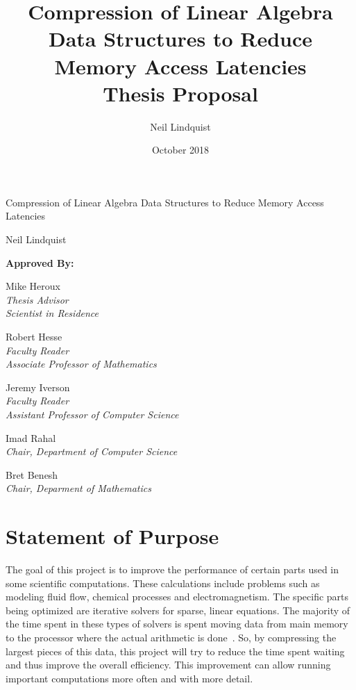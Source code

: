 \documentclass[titlepage]{article}
\begin{document}
\title{
	Compression of Linear Algebra Data Structures to Reduce Memory Access Latencies \\
	\bigskip
	\Large Thesis Proposal}
\author{Neil Lindquist}
\date{October 2018}

\maketitle

\begin{center}
	{\Large Compression of Linear Algebra Data Structures to Reduce Memory Access Latencies}
	
	Neil Lindquist
	
	\bigskip
	\bigskip
	
	\textbf{Approved By:}
	
	\bigskip
	
	Mike Heroux\\
	\textit{Thesis Advisor}\\
	\textit{Scientist in Residence}

	\bigskip

	Robert Hesse\\
	\textit{Faculty Reader}\\
	\textit{Associate Professor of Mathematics}

	\bigskip

	Jeremy Iverson\\
	\textit{Faculty Reader}\\
	\textit{Assistant Professor of Computer Science}
	
	\bigskip
	
	Imad Rahal\\
	\textit{Chair, Department of Computer Science}
	
	\bigskip
	
	Bret Benesh\\
	\textit{Chair, Deparment of Mathematics}
\end{center}

\clearpage


\section{Statement of Purpose}
The goal of this project is to improve the performance of certain parts
used in some scientific computations.
These calculations include problems such as modeling fluid flow, chemical processes and electromagnetism.
The specific parts being optimized are iterative solvers for sparse, linear equations.
The majority of the time spent in these types of solvers is spent moving data from main memory
to the processor where the actual arithmetic is done~\cite{Lawlor:2013:compression}.
So, by compressing the largest pieces of this data, this project will try to reduce the time spent waiting and thus improve the overall efficiency.
This improvement can allow running important computations more often and with more detail.
\end{document}

